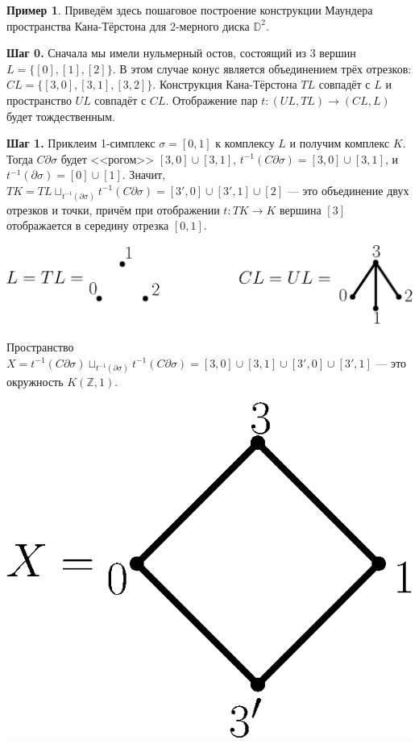 \documentclass[14pt, dvipsnames]{extarticle}
\theoremstyle{definition}
\newtheorem{example}{Пример}
\theoremstyle{remark}
\begin{document}
\begin{example}
Приведём здесь пошаговое построение конструкции Маундера пространства Кана-Тёрстона для 2-мерного диска $\mathbb{D}^2$.

{\bf Шаг 0.} Сначала мы имели нульмерный остов, состоящий из 3 вершин $L = \{[0], [1],  [2]\}$. В этом случае конус является объединением трёх отрезков: $CL = \{ [3, 0], [3, 1], [3, 2] \}$. Конструкция Кана-Тёрстона $TL$ совпадёт с $L$ и пространство $UL$ совпадёт с $CL$. Отображение пар $t: (UL, TL) \to (CL, L)$ будет тождественным.

{\bf Шаг 1.} Приклеим 1-симплекс $\sigma = [0, 1]$ к комплексу $L$ и получим комплекс $K$. Тогда $C\partial \sigma$ будет <<рогом>> $[3, 0]\cup [3, 1]$, $t^{-1}(C\partial \sigma) = [3, 0]\cup [3, 1]$, и $t^{-1}(\partial\sigma) = [0]\cup [1]$. Значит, $TK = TL\sqcup_{t^{-1}(\partial\sigma)} t^{-1}(C\partial\sigma) = [3', 0]\cup[3', 1]\cup [2]$ --- это объединение двух отрезков и точки, причём при отображении $t: TK\to K$ вершина $[3]$ отображается в середину отрезка $[0, 1]$. 

\begin{center}
\includegraphics[scale=0.5]{pict1}
\end{center}


Пространство $X = t^{-1}(C\partial\sigma)\sqcup_{t^{-1}(\partial\sigma)} t^{-1}(C\partial\sigma) = [3, 0]\cup [3,1] \cup [3', 0] \cup [3', 1]$ --- это окружность $K(\mathbb{Z}, 1)$. 

\begin{center}
\includegraphics[scale=0.5]{pict2}
\end{center}



\end{example}
\end{document}
